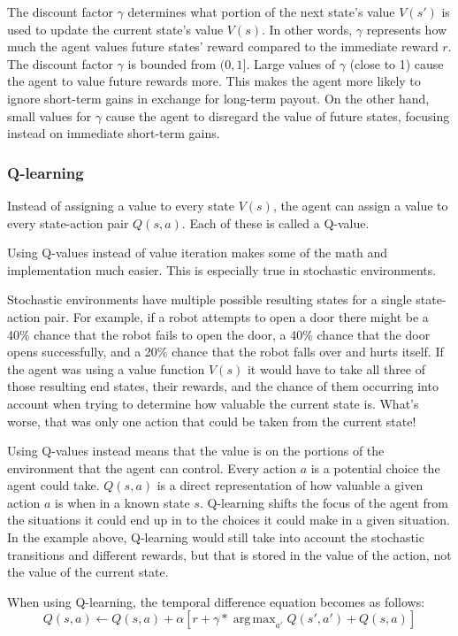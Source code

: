 \documentclass[12pt]{thesis}
\DeclareMathOperator*{\argmax}{arg\,max}
\begin{document}
The discount factor $\gamma$ determines what portion of the next state's value $V(s')$ is used to update the current state's value $V(s)$. In other words, $\gamma$ represents how much the agent values future states' reward compared to the immediate reward $r$. The discount factor $\gamma$ is bounded from $(0,1]$. Large values of $\gamma$ (close to 1) cause the agent to value future rewards more. This makes the agent more likely to ignore short-term gains in exchange for long-term payout. On the other hand, small values for $\gamma$ cause the agent to disregard the value of future states, focusing instead on immediate short-term gains.
\subsubsection{Q-learning}
Instead of assigning a value to every state $V(s)$, the agent can assign a value to every state-action pair $Q(s,a)$. Each of these is called a Q-value.

Using Q-values instead of value iteration makes some of the math and implementation much easier. This is especially true in stochastic environments.

Stochastic environments have multiple possible resulting states for a single state-action pair. For example, if a robot attempts to open a door there might be a 40\% chance that the robot fails to open the door, a 40\% chance that the door opens successfully, and a 20\% chance that the robot falls over and hurts itself. If the agent was using a value function $V(s)$ it would have to take all three of those resulting end states, their rewards, and the chance of them occurring into account when trying to determine how valuable the current state is. What's worse, that was only one action that could be taken from the current state!

Using Q-values instead means that the value is on the portions of the environment that the agent can control. Every action $a$ is a potential choice the agent could take. $Q(s,a)$ is a direct representation of how valuable a given action $a$ is when in a known state $s$. Q-learning shifts the focus of the agent from the situations it could end up in to the choices it could make in a given situation. In the example above, Q-learning would still take into account the stochastic transitions and different rewards, but that is stored in the value of the action, not the value of the current state.

When using Q-learning, the temporal difference equation becomes as follows:
\begin{equation}
	Q(s,a) \leftarrow Q(s,a) + \alpha [r + \gamma *  \argmax_{a'} Q(s',a') + Q(s,a)]
	\label{TDQVF}
\end{equation}
\end{document}
